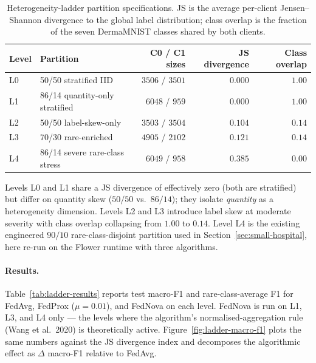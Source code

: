 \documentclass[11pt,a4paper]{report}
\begin{document}
\begin{table}[!htbp]
\centering
\caption{Heterogeneity-ladder partition specifications. JS is the
average per-client Jensen--Shannon divergence to the global label
distribution; class overlap is the fraction of the seven DermaMNIST
classes shared by both clients.}
\label{tab:ladder-partitions}
\small
\setlength{\tabcolsep}{5pt}
\renewcommand{\arraystretch}{1.15}
\begin{tabular}{@{}l l r r r@{}}
\toprule
Level & Partition & C0 / C1 sizes & JS divergence & Class overlap \\
\midrule
L0 & 50/50 stratified IID            & $3506$ / $3501$ & $0.000$ & $1.00$ \\
L1 & 86/14 quantity-only stratified  & $6048$ / $959$  & $0.000$ & $1.00$ \\
L2 & 50/50 label-skew-only           & $3503$ / $3504$ & $0.104$ & $0.14$ \\
L3 & 70/30 rare-enriched             & $4905$ / $2102$ & $0.121$ & $0.14$ \\
L4 & 86/14 severe rare-class stress  & $6049$ / $958$  & $0.385$ & $0.00$ \\
\bottomrule
\end{tabular}
\end{table}

Levels L0 and L1 share a JS divergence of effectively zero (both
are stratified) but differ on quantity skew ($50/50$ vs.\ $86/14$);
they isolate \emph{quantity} as a heterogeneity dimension. Levels
L2 and L3 introduce label skew at moderate severity with class
overlap collapsing from $1.00$ to $0.14$. Level L4 is the existing
engineered $90/10$ rare-class-disjoint partition used in
Section~\ref{sec:small-hospital}, here re-run on the Flower
runtime with three algorithms.

\paragraph{Results.}
Table~\ref{tab:ladder-results} reports test macro-F1 and
rare-class-average F1 for FedAvg, FedProx ($\mu = 0.01$), and
FedNova on each level. FedNova is run on L1, L3, and L4 only --- the
levels where the algorithm's normalised-aggregation rule
(Wang et al.\ 2020) is theoretically active. Figure~\ref{fig:ladder-macro-f1}
plots the same numbers against the JS divergence index and decomposes
the algorithmic effect as $\Delta$ macro-F1 relative to FedAvg.
\end{document}
